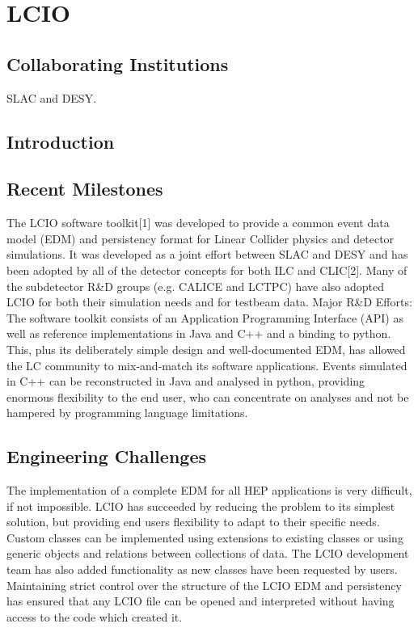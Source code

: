 \section{LCIO}
\subsection{Collaborating Institutions}
SLAC and DESY.

\subsection{Introduction}

\subsection{Recent Milestones}
The LCIO software toolkit[1] was developed to provide a common event data model
(EDM) and persistency format for Linear Collider physics and detector
simulations. It was developed as a joint effort between SLAC and DESY and has
been adopted by all of the detector concepts for both ILC and CLIC[2]. Many of
the subdetector R&D groups (e.g. CALICE and LCTPC) have also adopted LCIO for
both their simulation needs and for testbeam data. Major R&D Efforts: The
software toolkit consists of an Application Programming Interface (API) as well
as reference implementations in Java and C++ and a binding to python. This, plus
its deliberately simple design and well-documented EDM, has allowed the LC
community to mix-and-match its software applications. Events simulated in C++
can be reconstructed in Java and analysed in python, providing enormous
flexibility to the end user, who can concentrate on analyses and not be hampered
by programming language limitations.

\subsection{Engineering Challenges}
The implementation of a complete EDM for all HEP applications is very difficult,
if not impossible. LCIO has succeeded by reducing the problem to its simplest
solution, but providing end users flexibility to adapt to their specific needs.
Custom classes can be implemented using extensions to existing classes or using
generic objects and relations between collections of data. The LCIO development
team has also added functionality as new classes have been requested by users.
Maintaining strict control over the structure of the LCIO EDM and persistency
has ensured that any LCIO file can be opened and interpreted without having
access to the code which created it.

